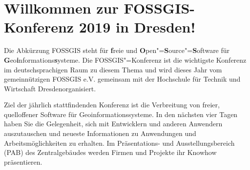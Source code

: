 \newpage
\section*{Willkommen zur FOSSGIS-Konferenz 2019 in Dresden!} \label{welcome}
Die Abkürzung { FOSSGIS} steht für {\bf f}reie und {\bf O}pen"={\bf S}ource"={\bf S}oftware für {\bf G}eo{\bf i}nformations{\bf s}ysteme.
Die FOSSGIS"=Konferenz ist die wichtigste Konferenz im deutschsprachigen Raum zu
diesem \mbox{Thema} und wird dieses Jahr vom gemeinnützigen FOSSGIS e.V.
gemeinsam mit der Hochschule für Technik und Wirtschaft Dresden\linebreak organisiert.

Ziel der jährlich stattfindenden Konferenz ist die Verbreitung von freier,
quelloffener Software für Geoinformationssysteme. In den nächsten vier Tagen
haben Sie die Gelegenheit, sich mit Entwicklern und anderen Anwendern
auszutauschen und \mbox{neueste} Informationen zu Anwendungen und
Arbeitsmöglichkeiten zu erhalten. Im Präsentations- und Ausstellungsbereich (PAB) des Zentralgebäudes werden Firmen
und Projekte ihr Knowhow präsentieren.

\newpage


